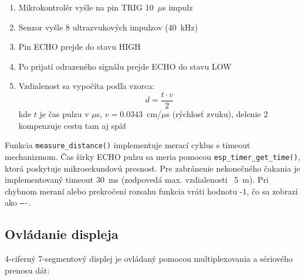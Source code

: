 \documentclass[a4paper, 11pt]{article}
\begin{document}
\begin{enumerate}
    \item Mikrokontrolér vyšle na pin TRIG 10~$\mu$s impulz
    \item Senzor vyšle 8 ultrazvukových impulzov (40~kHz)
    \item Pin ECHO prejde do stavu HIGH
    \item Po prijatí odrazeného signálu prejde ECHO do stavu LOW
    \item Vzdialenost sa vypočíta podľa vzorca:
    \[
    d = \frac{t \cdot v}{2}
    \]
    kde $t$ je čas pulzu v $\mu$s, $v = 0.0343$~cm/$\mu$s (rýchlosť zvuku), delenie 2 kompenzuje cestu tam aj späť
\end{enumerate}

Funkcia \texttt{measure\_distance()} implementuje merací cyklus s timeout mechanizmom. Čas šírky ECHO pulzu sa meria pomocou \texttt{esp\_timer\_get\_time()}, ktorá poskytuje mikrosekundovú presnosť. Pre zabránenie nekonečného čakania je implementovaný timeout 30~ms (zodpovedá max. vzdialenosti ~5~m). Pri chybnom meraní alebo prekročení rozsahu funkcia vráti hodnotu -1, čo sa zobrazí ako \texttt{----}.

\subsection{Ovládanie displeja}
4-ciferný 7-segmentový displej je ovládaný pomocou multiplexovania a sériového prenosu dát:
\end{document}
